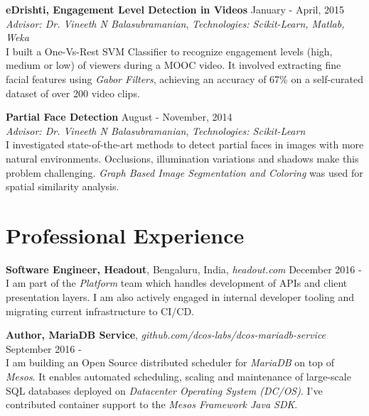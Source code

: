 \documentclass[margin,line]{res}
\begin{document}
\begin{resume}
  \vspace*{-2.5mm}

  {\bf eDrishti, Engagement Level Detection in Videos} \hfill January - April, 2015 \\
  	{\em Advisor: Dr. Vineeth N Balasubramanian}, {\em Technologies: Scikit-Learn, Matlab, Weka} \vspace{0.15 \baselineskip} \\
  	I built a One-Vs-Rest SVM Classifier to recognize engagement levels (high, medium or low) of viewers during a MOOC video. It involved extracting fine facial features using {\it Gabor Filters}, achieving an accuracy of 67\% on a self-curated dataset of over 200 video clips.

  \vspace*{-2.5mm}

  {\bf Partial Face Detection} \hfill August - November, 2014 \\
  	{\em Advisor: Dr. Vineeth N Balasubramanian}, {\em Technologies: Scikit-Learn} \vspace{0.15 \baselineskip} \\
  I investigated state-of-the-art methods to detect partial faces in images with more natural environments. Occlusions, illumination variations and shadows make this problem challenging. {\it Graph Based Image Segmentation and Coloring} was used for spatial similarity analysis.

\section{\sc Professional Experience}

  {\bf Software Engineer, Headout}, Bengaluru, India, {\it headout.com}  \hfill December 2016 - \\
    I am part of the {\it Platform} team which handles development of APIs and client presentation layers. I am also actively engaged in internal developer tooling and migrating current infrastructure to CI/CD.

  \vspace*{-2.5mm}

  {\bf Author, MariaDB Service}, {\it github.com/dcos-labs/dcos-mariadb-service} \hfill September 2016 - \\
    I am building an Open Source distributed scheduler for {\it MariaDB} on top of {\em Mesos}. It enables automated scheduling, scaling and maintenance of large-scale SQL databases deployed on {\it Datacenter Operating System (DC/OS)}. I've contributed container support to the {\it Mesos Framework Java SDK}.


\end{resume}
\end{document}
